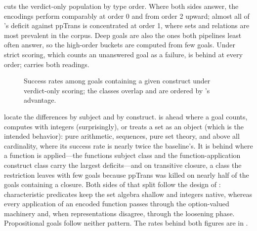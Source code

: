  cuts the verdict-only population by type order.
Where both sides answer, the encodings perform comparably at order 0 and from order 2 upward; almost all of \beer{}'s deficit against ppTrans is concentrated at order 1, where sets and relations are most prevalent in the corpus.
Deep goals are also the ones both pipelines least often answer, so the high-order buckets are computed from few goals.
Under strict scoring, which counts an unanswered goal as a failure, \beer{} is behind at every order;  carries both readings.

\begin{figure}[!htbp]
\centering
{}
\caption{Success rates among goals containing a given construct under
  verdict-only scoring; the classes overlap and are ordered by \beer{}'s
  advantage.}
\label{fig:eval-construct}
\end{figure}

 locate the differences by subject and by construct.
\beer{} is ahead where a goal counts, computes with integers (surprisingly), or treats a set as an object (which is the intended behavior): pure arithmetic, sequences, pure set theory, and above all cardinality, where its success rate is nearly twice the baseline's.
It is behind where a function is applied---the functions subject class and the function-application construct class carry the largest deficits---and on transitive closure, a class the restriction leaves with few goals because ppTrans was killed on nearly half of the goals containing a closure.
Both sides of that split follow the design of : characteristic predicates keep the set algebra shallow and integers native, whereas every application of an encoded function passes through the option-valued machinery and, when representations disagree, through the loosening phase.
Propositional goals follow neither pattern.
The rates behind both figures are in .

